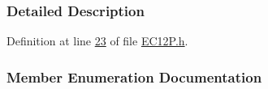 \subsubsection{Detailed Description}


Definition at line \hyperlink{_e_c12_p_8h_source_l00023}{23} of file \hyperlink{_e_c12_p_8h_source}{E\+C12\+P.\+h}.



\subsubsection{Member Enumeration Documentation}
\hypertarget{class_hardware_1_1_e_c12_p_a8341f410cd939bf03160fe239bc782aa}{}
